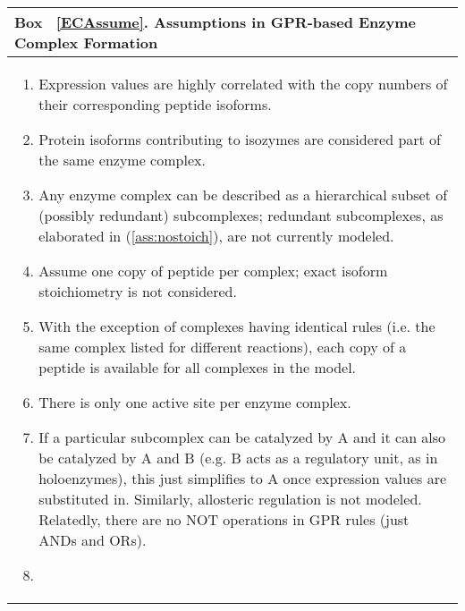 \label{ECAssume}
\begin{center}
\begin{tabular}{| p{14cm} |}
\hline
\textbf{Box ~\ref{ECAssume}. Assumptions in GPR-based Enzyme Complex Formation} \\
\hline
\begin{enumerate}
\item \begin{assume} \label{ass:expcorr}
Expression values are highly correlated with the copy numbers of their
corresponding peptide isoforms.
\end{assume}
\item \begin{assume} \label{ass:isozyme} 
Protein isoforms contributing to isozymes are considered part of the
same enzyme complex.
\end{assume}
\item \begin{assume} \label{ass:hierarchy}
Any enzyme complex can be described as a hierarchical subset of
(possibly redundant) subcomplexes; redundant subcomplexes, as
elaborated in (\ref{ass:nostoich}), are not currently modeled.
\end{assume}
\item \begin{assume} \label{ass:nostoich} 
Assume one copy of peptide per complex; exact isoform stoichiometry
is not considered.
\end{assume}
\item \begin{assume} \label{ass:sharing} 
With the exception of complexes having identical rules (i.e. the same
complex listed for different reactions), each copy of a peptide
is available for all complexes in the model.
\end{assume}
\item \begin{assume} \label{ass:active_site}
There is only one active site per enzyme complex.
\end{assume}
\item \begin{assume} \label{ass:holo} 
If a particular subcomplex can be catalyzed by A and it can also be
catalyzed by A and B (e.g. B acts as a regulatory unit, as in
holoenzymes), this just simplifies to A once expression values are
substituted in. Similarly, allosteric regulation is not
modeled. Relatedly, there are no NOT operations in GPR rules (just ANDs
and ORs).
\end{assume}
\item \begin{assume} \label{ass:chap} 

\end{assume}
\end{enumerate}
\end{tabular}
\end{center}

